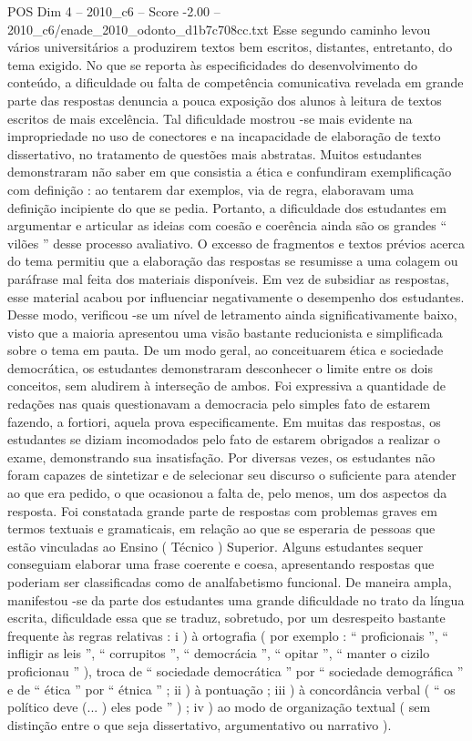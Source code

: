 \begin{textsample}{POS Dim 4 – 2010\_c6 – Score -2.00 – 2010\_c6/enade\_2010\_odonto\_d1b7c708cc.txt}
Esse segundo caminho levou vários universitários a produzirem textos bem escritos, distantes, entretanto, do tema exigido.
No que se reporta às especificidades do desenvolvimento do conteúdo, a dificuldade ou falta de competência comunicativa revelada em grande parte das respostas denuncia a pouca exposição dos alunos à leitura de textos escritos de mais excelência.
Tal dificuldade mostrou -se mais evidente na impropriedade no uso de conectores e na incapacidade de elaboração de texto dissertativo, no tratamento de questões mais abstratas.
Muitos estudantes demonstraram não saber em que consistia a ética e confundiram exemplificação com definição : ao tentarem dar exemplos, via de regra, elaboravam uma definição incipiente do que se pedia.
Portanto, a dificuldade dos estudantes em argumentar e articular as ideias com coesão e coerência ainda são os grandes “ vilões ” desse processo avaliativo.
O excesso de fragmentos e textos prévios acerca do tema permitiu que a elaboração das respostas se resumisse a uma colagem ou paráfrase mal feita dos materiais disponíveis.
Em vez de subsidiar as respostas, esse material acabou por influenciar negativamente o desempenho dos estudantes.
Desse modo, verificou -se um nível de letramento ainda significativamente baixo, visto que a maioria apresentou uma visão bastante reducionista e simplificada sobre o tema em pauta.
De um modo geral, ao conceituarem ética e sociedade democrática, os estudantes demonstraram desconhecer o limite entre os dois conceitos, sem aludirem à interseção de ambos.
Foi expressiva a quantidade de redações nas quais questionavam a democracia pelo simples fato de estarem fazendo, a fortiori, aquela prova especificamente.
Em muitas das respostas, os estudantes se diziam incomodados pelo fato de estarem obrigados a realizar o exame, demonstrando sua insatisfação.
Por diversas vezes, os estudantes não foram capazes de sintetizar e de selecionar seu discurso o suficiente para atender ao que era pedido, o que ocasionou a falta de, pelo menos, um dos aspectos da resposta.
Foi constatada grande parte de respostas com problemas graves em termos textuais e gramaticais, em relação ao que se esperaria de pessoas que estão vinculadas ao Ensino ( Técnico ) Superior.
Alguns estudantes sequer conseguiam elaborar uma frase coerente e coesa, apresentando respostas que poderiam ser classificadas como de analfabetismo funcional.
De maneira ampla, manifestou -se da parte dos estudantes uma grande dificuldade no trato da língua escrita, dificuldade essa que se traduz, sobretudo, por um desrespeito bastante frequente às regras relativas : i ) à ortografia ( por exemplo : “ proficionais ”, “ infligir as leis ”, “ corrupitos ”, “ democrácia ”, “ opitar ”, “ manter o cizilo proficionau ” ), troca de “ sociedade democrática ” por “ sociedade demográfica ” e de “ ética ” por “ étnica ” ; ii ) à pontuação ; iii ) à concordância verbal ( “ os político deve (... ) eles pode ” ) ; iv ) ao modo de organização textual ( sem distinção entre o que seja dissertativo, argumentativo ou narrativo ).

\end{textsample}
